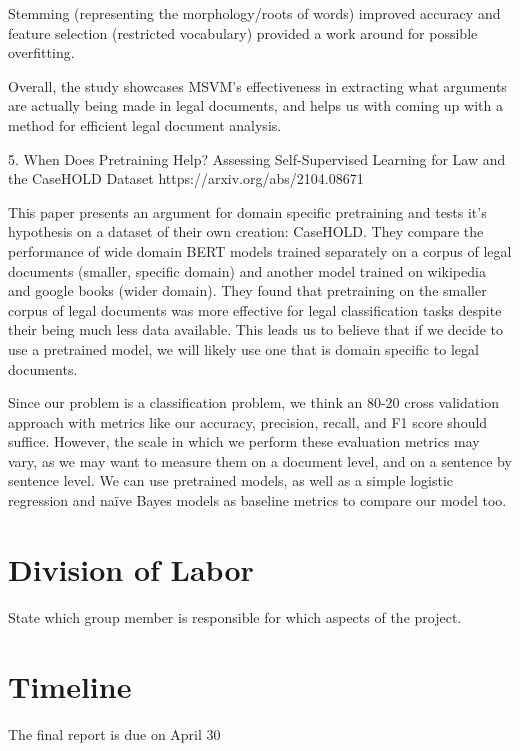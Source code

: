 \documentclass[11pt,a4paper]{article}
\begin{document}
Stemming (representing the morphology/roots of words) improved accuracy and feature selection (restricted vocabulary) provided a work around for possible overfitting.

Overall, the study showcases MSVM's effectiveness in extracting what arguments are actually being made in legal documents,
and helps us with coming up with a method for efficient legal document analysis.

5. When Does Pretraining Help? Assessing Self-Supervised Learning for Law and the CaseHOLD Dataset
https://arxiv.org/abs/2104.08671

This paper presents an argument for domain specific pretraining and tests it's hypothesis on a dataset of their own creation: CaseHOLD. They compare the performance of wide domain BERT models trained separately on a corpus of legal documents (smaller, specific domain) and another model trained on wikipedia and google books (wider domain). They found that pretraining on the smaller corpus of legal documents was more effective for legal classification tasks despite their being much less data available. This leads us to believe that if we decide to use a pretrained model, we will likely use one that is domain specific to legal documents. 

Since our problem is a classification problem, we think an 80-20 cross validation approach with metrics like our accuracy, precision, recall, and F1 score should suffice. However, the scale in which we perform these evaluation metrics may vary, as we may want to measure them on a document level, and on a sentence by sentence level. We can use pretrained models, as well as a simple logistic regression and naïve Bayes models as baseline metrics to compare our model too. 

\section{Division of Labor}
State which group member is responsible for which aspects of the project.


\section{Timeline}



The final report is due on April 30
\end{document}
